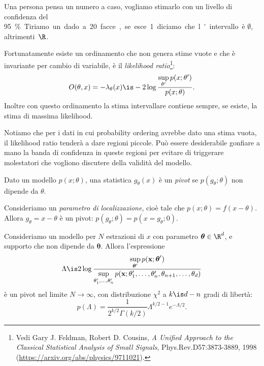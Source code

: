 \begin{example}
	Una persona pensa un numero a caso,
	vogliamo stimarlo con un livello di confidenza del \SI{95}\%.
	Tiriamo un dado a 20 facce,
	se esce 1 diciamo che l'intervallo è $\emptyset$, altrimenti~$\R$.
\end{example}

Fortunatamente esiste un ordinamento che non genera stime vuote e che è invariante per cambio di variabile,
è il \emph{likelihood ratio}\footnote{Vedi Gary J. Feldman, Robert D. Cousins, \emph{A Unified Approach to the Classical Statistical Analysis of Small Signals},  Phys.Rev.D57:3873-3889, 1998 (\url{https://arxiv.org/abs/physics/9711021}).}:
\begin{equation*}
	O(\theta,x) = -\lambda_\theta(x)
	\is -2\log\frac {\sup\limits_{\theta'} p(x;\theta')} {p(x;\theta)}.
\end{equation*}
Inoltre con questo ordinamento la stima intervallare contiene sempre,
se esiste,
la stima di massima likelihood.

Notiamo che per i dati in cui probability ordering avrebbe dato una stima vuota,
il likelihood ratio tenderà a dare regioni piccole.
Può essere desiderabile gonfiare a mano la banda di confidenza in queste regioni
per evitare di triggerare molestatori che vogliono discutere della validità del modello.

\begin{definition}[Pivot]
	Dato un modello $p(x;\theta)$,
	una statistica $g_\theta(x)$ è un \emph{pivot}
	se $p(g_\theta;\theta)$ non dipende da $\theta$.
\end{definition}

\begin{example}
	Consideriamo un \emph{parametro di localizzazione},
	cioè tale che $p(x;\theta)=f(x-\theta)$.
	Allora $g_\theta=x-\theta$ è un pivot:
	$p(g_\theta;\theta) = p(x=g_\theta;0)$.
\end{example}

\begin{fact}
	\label{th:wilks}
	Consideriamo un modello per $N$ estrazioni di $x$ con parametro $\boldsymbol\theta\in\R^d$,
	e supporto che non dipende da $\boldsymbol\theta$.
	Allora l'espressione
	\begin{equation*}
		\Lambda \is
		2\log\frac {\sup\limits_{\boldsymbol\theta'} p(\mathbf x;\boldsymbol\theta')}
		{\sup\limits_{\theta_1',\dotsc,\theta_n'} p(\mathbf x;\theta_1',\dotsc,\theta_n',\theta_{n+1},\dots,\theta_d)}
	\end{equation*}
	è un pivot nel limite $N\to\infty$,
	con distribuzione $\chi^2$ a $k\is d-n$ gradi di libertà:
	\begin{equation*}
		p(\Lambda)
		= \frac1{2^{k/2}\Gamma(k/2)} \Lambda^{k/2-1} e^{-\Lambda/2}.
	\end{equation*}
\end{fact}

